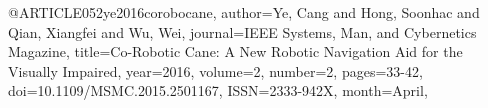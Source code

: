 @ARTICLE{052ye2016corobocane,
author={Ye, Cang and Hong, Soonhac and Qian, Xiangfei and Wu, Wei},
journal={IEEE Systems, Man, and Cybernetics Magazine}, 
title={Co-Robotic Cane: A New Robotic Navigation Aid for the Visually Impaired}, 
year={2016},
volume={2},
number={2},
pages={33-42},
doi={10.1109/MSMC.2015.2501167},
ISSN={2333-942X},
month={April},}